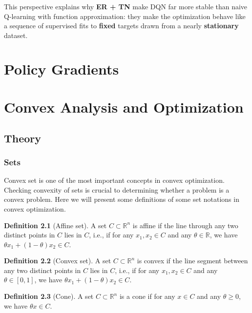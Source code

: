\documentclass[
]{book}
\theoremstyle{definition}
\newtheorem{definition}{Definition}[chapter]
\theoremstyle{definition}
\theoremstyle{definition}
\theoremstyle{definition}
\theoremstyle{remark}
\begin{document}
This perspective explains why \textbf{ER + TN} make DQN far more stable than naive Q-learning with function approximation: they make the optimization behave like a sequence of supervised fits to \textbf{fixed} targets drawn from a nearly \textbf{stationary} dataset.

\chapter{Policy Gradients}\label{policy-gradient}

\appendix


\chapter{Convex Analysis and Optimization}\label{appconvex}

\section{Theory}\label{appconvex-theory}

\subsection{Sets}\label{sets}

Convex set is one of the most important concepts in convex optimization. Checking convexity of sets is crucial to determining whether a problem is a convex problem. Here we will present some definitions of some set notations in convex optimization.

\begin{definition}[Affine set]
\protect\hypertarget{def:affineset}{}\label{def:affineset}A set \(C\subset \mathbb{R}^n\) is affine if the line through any two distinct points in \(C\) lies in \(C\), i.e., if for any \(x_1,x_2 \in C\) and any \(\theta \in \mathbb{R}\), we have \(\theta x_1 + (1-\theta)x_2 \in C\).
\end{definition}

\begin{definition}[Convex set]
\protect\hypertarget{def:convexset}{}\label{def:convexset}A set \(C\subset \mathbb{R}^n\) is convex if the line segment between any two distinct points in \(C\) lies in \(C\), i.e., if for any \(x_1,x_2 \in C\) and any \(\theta \in [0,1]\), we have \(\theta x_1 + (1-\theta)x_2 \in C\).
\end{definition}

\begin{definition}[Cone]
\protect\hypertarget{def:cone}{}\label{def:cone}A set \(C\subset \mathbb{R}^n\) is a cone if for any \(x\in C\) and any \(\theta\geq 0\), we have \(\theta x \in C\).
\end{definition}
\end{document}
